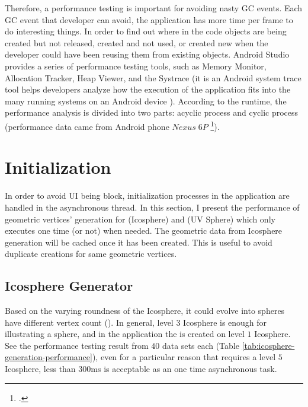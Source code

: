 Therefore, a performance testing is important for avoiding nasty GC events. Each GC event that developer can avoid, the application has more time per frame to do interesting things. In order to find out where in the code objects are being created but not released, created and not used, or created new when the developer could have been reusing them from existing objects. Android Studio provides a series of performance testing tools, such as Memory Monitor, Allocation Tracker, Heap Viewer, and the Systrace (it is an Android system trace tool helps developers analyze how the execution of the application fits into the many running systems on an Android device \cite{google.systrace.2016}). According to the runtime, the performance analysis is divided into two parts: acyclic process and cyclic process (performance data came from Android phone $Nexus\;6P$ \footcite{CPU: 2.0GHz octa-core, 64-bit ARM Cortex-A57 & ARM Cortex-A53, 8 cores; GPU: Adreno 430}).

\section{Initialization}

In order to avoid UI being block, initialization processes in the application are handled in the asynchronous thread. In this section, I present the performance of geometric vertices' generation for  (Icosphere) and  (UV Sphere) which only executes one time (or not) when needed. The geometric data from Icosphere generation will be cached once it has been created. This is useful to avoid duplicate creations for same geometric vertices.

\subsection{Icosphere Generator}

Based on the varying roundness of the Icosphere, it could evolve into spheres have different vertex count (). In general, level $3$ Icosphere is enough for illustrating a sphere, and in the application the  is created on level $1$ Icosphere. See the performance testing result from $40$ data sets each (Table \ref{tab:icosphere-generation-performance}), even for a particular reason that requires a level $5$ Icosphere, less than $300$ms is acceptable as an one time asynchronous task.

